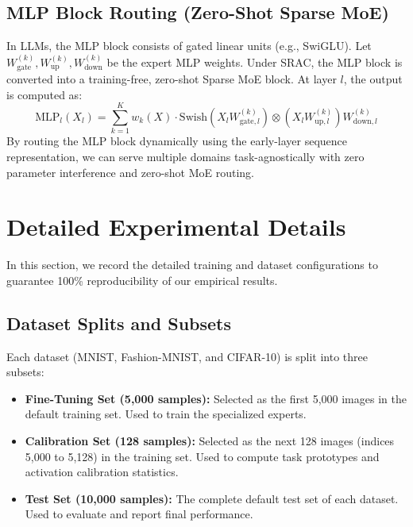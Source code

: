 \documentclass{article}
\theoremstyle{plain}
\theoremstyle{definition}
\theoremstyle{remark}
\begin{document}
\subsection{MLP Block Routing (Zero-Shot Sparse MoE)}
In LLMs, the MLP block consists of gated linear units (e.g., SwiGLU). Let $W_{\text{gate}}^{(k)}, W_{\text{up}}^{(k)}, W_{\text{down}}^{(k)}$ be the expert MLP weights. Under SRAC, the MLP block is converted into a training-free, zero-shot Sparse MoE block. At layer $l$, the output is computed as:
\begin{equation}
  \text{MLP}_l(X_l) = \sum_{k=1}^K w_k(X) \cdot \text{Swish}\left(X_l W_{\text{gate},l}^{(k)}\right) \otimes \left(X_l W_{\text{up},l}^{(k)}\right) W_{\text{down},l}^{(k)}
\end{equation}
By routing the MLP block dynamically using the early-layer sequence representation, we can serve multiple domains task-agnostically with zero parameter interference and zero-shot MoE routing.

\section{Detailed Experimental Details}
\label{sec:appendix_exp_details}

In this section, we record the detailed training and dataset configurations to guarantee 100\% reproducibility of our empirical results.

\subsection{Dataset Splits and Subsets}
Each dataset (MNIST, Fashion-MNIST, and CIFAR-10) is split into three subsets:
\begin{itemize}
  \item \textbf{Fine-Tuning Set (5,000 samples):} Selected as the first 5,000 images in the default training set. Used to train the specialized experts.
  \item \textbf{Calibration Set (128 samples):} Selected as the next 128 images (indices 5,000 to 5,128) in the training set. Used to compute task prototypes and activation calibration statistics.
  \item \textbf{Test Set (10,000 samples):} The complete default test set of each dataset. Used to evaluate and report final performance.
\end{itemize}
\end{document}
